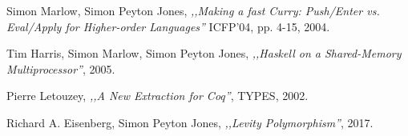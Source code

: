 \documentclass[en]{pracamgr}
\begin{document}
\begin{thebibliography}{99}
 Simon Marlow, Simon Peyton Jones, \textit{,,Making a fast Curry: Push/Enter vs. Eval/Apply for Higher-order Languages''} ICFP'04, pp. 4-15, 2004.

 Tim Harris, Simon Marlow, Simon Peyton Jones, \textit{,,Haskell on a Shared-Memory Multiprocessor''}, 2005.

 Pierre Letouzey, \textit{,,A New Extraction for Coq''}, TYPES, 2002.

 Richard A. Eisenberg, Simon Peyton Jones, \textit{,,Levity Polymorphism''}, 2017.

\end{thebibliography}
\end{document}

